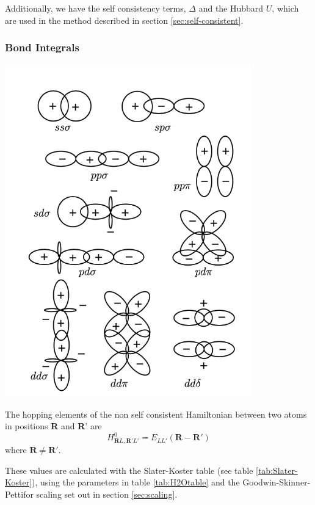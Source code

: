 \documentclass{article}
\newenvironment{Figure}{\par\medskip\noindent\minipage{\linewidth}}{\endminipage\par\medskip}
\begin{document}
\begin{multicols}{2}
Additionally, we have the self consistency terms, $\Delta$ and the Hubbard $U$, which are used in the method described in section \ref{sec:self-consistent}.
\subsubsection{Bond Integrals}
\begin{Figure}
	\centering
	\includegraphics[width=0.8\textwidth]{figures/bond_integrals.png}
	\label{fig:Bond Integrals}
\end{Figure}
\noindent The hopping elements of the non self consistent Hamiltonian between two atoms in positions \textbf{R} and \textbf{R}' are 
\begin{equation}
	H^{0}_{\textbf{R}L,\textbf{R}'L'}=E_{LL'}(\textbf{R}-\textbf{R}')
\end{equation}
where $\textbf{R}\neq\textbf{R}'$.\cite{Lozovoi2014}

These values are calculated with the Slater-Koster table (see table \ref{tab:Slater-Koster}), using the parameters in table \ref{tab:H2Otable} and the Goodwin-Skinner-Pettifor scaling set out in section \ref{sec:scaling}.


\end{multicols}
\end{document}
